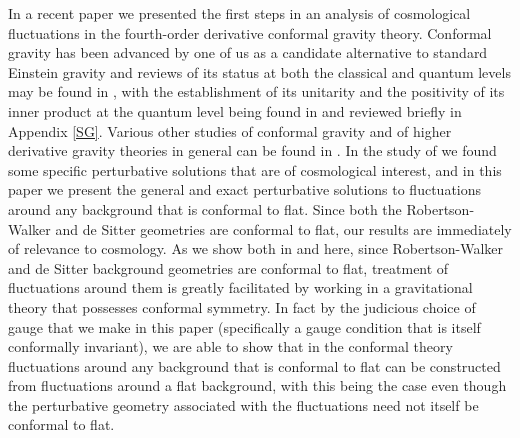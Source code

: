 \documentclass[aps]{revtex4}
\begin{document}
In a recent paper \cite{Mannheim2012a} we presented the first steps in an analysis of cosmological fluctuations in the fourth-order derivative conformal gravity theory. Conformal gravity has been advanced by one of us as a candidate alternative to standard Einstein gravity and reviews of its status at both the classical and quantum levels may be found in \cite{Mannheim2006,Mannheim2012b,Mannheim2017}, with the establishment of its unitarity and the positivity of its inner product at the quantum level being found in \cite{Bender2008a,Bender2008b,Mannheim2011a,Mannheim2018} and reviewed briefly in Appendix \ref{SG}. Various other studies of conformal gravity and of higher derivative gravity theories in general can be found in \cite{Hoyle1964,Stelle1977,Stelle1978,Adler1982,Lee1982,Zee1983,Riegert1984a,Riegert1984b,Teyssandier1989,'tHooft2010a,'tHooft2010b,'tHooft2011,'tHooft2015a,Maldacena2011}. In the study of \cite{Mannheim2012a} we found some specific perturbative solutions that are of cosmological interest, and in this paper we present the general and exact perturbative solutions to fluctuations around any background that is conformal to flat. Since both the Robertson-Walker and de Sitter geometries are conformal to flat, our results are immediately of relevance to cosmology. As we show both in \cite{Mannheim2012a} and here, since Robertson-Walker and de Sitter  background geometries are conformal to flat, treatment of fluctuations around them is greatly facilitated by working in a gravitational theory that possesses conformal symmetry. In fact by the judicious choice of gauge that we make in this paper (specifically a gauge condition that is itself conformally invariant), we are able to show that in the conformal theory fluctuations around any background that is conformal to flat can be constructed from fluctuations around a flat background, with this being the case even though the perturbative geometry associated with the fluctuations need not itself be conformal to flat.
\end{document}
